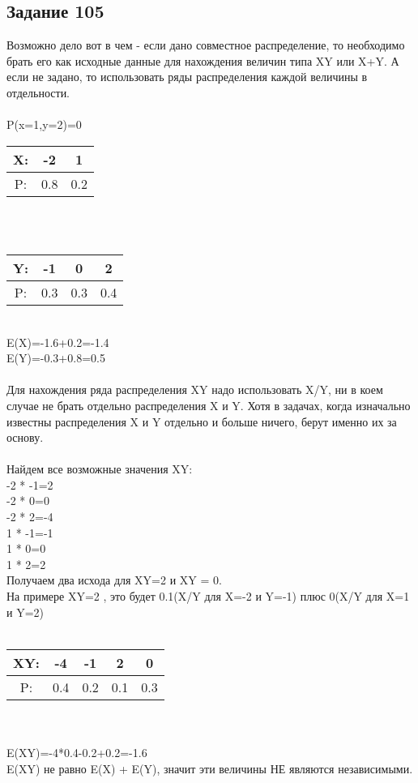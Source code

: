 \documentclass[12pt]{article}
\begin{document}
\subsection{Задание 105}
Возможно дело вот в чем - если дано совместное распределение, то необходимо брать его как исходные данные для нахождения величин типа XY или X+Y. А если не задано, то использовать ряды распределения каждой величины в отдельности.\\
\\
P(x=1,y=2)=0\\
\begin{tabular}{|c|c|c|}
\hline
X: & -2 & 1  \\
\hline
P: & 0.8 & 0.2  \\
\hline
\end{tabular}
\\
\\
\begin{tabular}{|c|c|c|c|}
\hline
Y: & -1 & 0 & 2  \\
\hline
P: & 0.3 & 0.3 & 0.4  \\
\hline
\end{tabular}
\\
E(X)=-1.6+0.2=-1.4\\
E(Y)=-0.3+0.8=0.5\\
\\
Для нахождения ряда распределения XY надо использовать X/Y, ни в коем случае не брать отдельно распределения X и Y. Хотя в задачах, когда изначально известны распределения X и Y отдельно и больше ничего, берут именно их за основу.\\
\\
Найдем все возможные значения XY:\\
-2 * -1=2\\
-2 * 0=0\\
-2 * 2=-4\\
1 * -1=-1\\
1 * 0=0\\
1 * 2=2\\
Получаем два исхода для XY=2 и XY = 0.\\
На примере XY=2 , это будет 0.1(X/Y для X=-2 и Y=-1) плюс 0(X/Y для X=1 и Y=2)\\
\\
\begin{tabular}{|c|c|c|c|c|}
\hline
XY: & -4 & -1 & 2 & 0\\
\hline
P: & 0.4 & 0.2 & 0.1 & 0.3  \\
\hline
\end{tabular}
\\ 
\\
E(XY)=-4*0.4-0.2+0.2=-1.6\\
E(XY) не равно E(X) + E(Y), значит эти величины НЕ являются независимыми.
\end{document}
